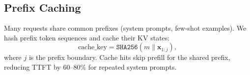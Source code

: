 \subsection{Prefix Caching}

Many requests share common prefixes (system prompts, few-shot examples). We
hash prefix token sequences and cache their KV states:
\begin{equation}
\text{cache\_key} = \texttt{SHA256}(m \| \mathbf{x}_{1:j}),
\end{equation}
where $j$ is the prefix boundary. Cache hits skip prefill for the shared prefix,
reducing TTFT by 60--80\% for repeated system prompts.

